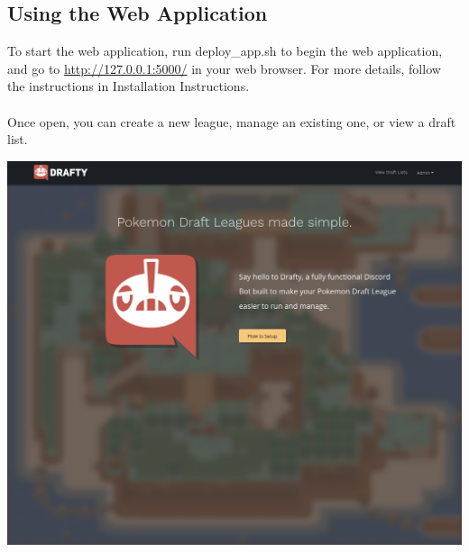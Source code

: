 \documentclass{article}
\begin{document}
\subsection*{Using the Web Application}
  To start the web application, run deploy\_app.sh to begin the web application, and go to \url{http://127.0.0.1:5000/} in your web browser. For more details, follow the instructions in Installation Instructions.\\\\
  Once open, you can create a new league, manage an existing one, or view a draft list.\\
  \begin{center}
    \includegraphics[scale=.3]{landing.png}
  \end{center}
\end{document}
